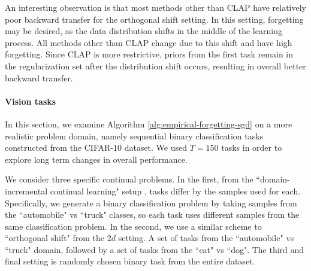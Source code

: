 \documentclass{article}
\theoremstyle{plain}
\theoremstyle{definition}
\theoremstyle{remark}
\begin{document}

An interesting observation is that most methods other than CLAP have relatively poor backward transfer for the orthogonal shift setting. In this setting, forgetting may be desired, as the data distribution shifts in the middle of the learning process. All methods other than CLAP change due to this shift and have high forgetting. Since CLAP is more restrictive, priors from the first task remain in the regularization set after the distribution shift occurs, resulting in overall better backward transfer.
\paragraph{Vision tasks} 
In this section, we examine Algorithm \ref{alg:empirical-forgetting-sgd} on a more realistic problem domain, namely sequential binary classification tasks constructed from the CIFAR-$10$ \citep{krizhevsky2009learning} dataset. We used $T=150$ tasks in order to explore long term changes in overall performance.

We consider three specific continual problems. In the first, from the ``domain-incremental continual learning" setup \citep{de2021continual}, tasks differ by the samples used for each. Specifically, we generate a binary classification problem by taking samples from the ``automobile" vs ``truck" classes, so each task uses different samples from the same classification problem. In the second, we use a similar scheme to ``orthogonal shift" from the $2d$ setting. A set of tasks from the ``automobile" vs ``truck" domain, followed by a set of tasks from the ``cat" vs ``dog". The third and final setting is randomly chosen binary task from the entire dataset.
\end{document}
